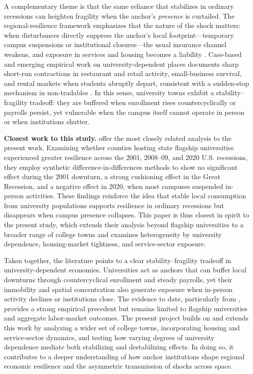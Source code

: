 \noindent A complementary theme is that the same reliance that stabilizes in ordinary recessions can heighten fragility when the anchor’s \emph{presence} is curtailed. The regional-resilience framework emphasizes that the nature of the shock matters: when disturbances directly suppress the anchor’s local footprint—temporary campus suspensions or institutional closures—the usual insurance channel weakens, and exposure in services and housing becomes a liability \citep{martinNotionRegionalEconomic2015}. Case-based and emerging empirical work on university-dependent places documents sharp short-run contractions in restaurant and retail activity, small-business survival, and rental markets when students abruptly depart, consistent with a sudden-stop mechanism in non-tradables \citep{howardUniversitiesImproveLocal2024,Harker2024AnchorReliance}. In this sense, university towns exhibit a stability–fragility tradeoff: they are buffered when enrollment rises countercyclically or payrolls persist, yet vulnerable when the campus itself cannot operate in person or when institutions shutter.


\noindent \textbf{Closest work to this study.} \citet{jumpResearchUniversitiesRecession} offer the most closely related analysis to the present work. Examining whether counties hosting state flagship universities experienced greater resilience across the 2001, 2008–09, and 2020 U.S. recessions, they employ synthetic difference-in-differences methods to show no significant effect during the 2001 downturn, a strong cushioning effect in the Great Recession, and a negative effect in 2020, when most campuses suspended in-person activities. These findings reinforce the idea that stable local consumption from university populations supports resilience in ordinary recessions but disappears when campus presence collapses. This paper is thus closest in spirit to the present study, which extends their analysis beyond flagship universities to a broader range of college towns and examines heterogeneity by university dependence, housing-market tightness, and service-sector exposure.

\noindent Taken together, the literature points to a clear stability–fragility tradeoff in university-dependent economies. Universities act as anchors that can buffer local downturns through countercyclical enrollment and steady payrolls, yet their immobility and spatial concentration also generate exposure when in-person activity declines or institutions close. The evidence to date, particularly from \citet{jumpResearchUniversitiesRecession}, provides a strong empirical precedent but remains limited to flagship universities and aggregate labor-market outcomes. The present project builds on and extends this work by analyzing a wider set of college towns, incorporating housing and service-sector dynamics, and testing how varying degrees of university dependence mediate both stabilizing and destabilizing effects. In doing so, it contributes to a deeper understanding of how anchor institutions shape regional economic resilience and the asymmetric transmission of shocks across space.



